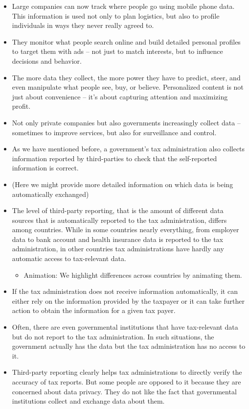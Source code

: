 \documentclass[11pt]{article}
\begin{document}
\begin{itemize}
    \item Large companies can now track where people go using mobile phone data. This information is used not only to plan logistics, but also to profile individuals in ways they never really agreed to.
    \item They monitor what people search online and build detailed personal profiles to target them with ads – not just to match interests, but to influence decisions and behavior.
    \item The more data they collect, the more power they have to predict, steer, and even manipulate what people see, buy, or believe. Personalized content is not just about convenience – it’s about capturing attention and maximizing profit.
    \item Not only private companies but also governments increasingly collect data – sometimes to improve services, but also for surveillance and control.
    \item As we have mentioned before, a government's tax administration also collects information reported by third-parties to check that the self-reported information is correct. 
    \item (Here we might provide more detailed information on which data is being automatically exchanged)
    \item The level of third-party reporting, that is the amount of different data sources that is automatically reported to the tax administration, differs among countries. While in some countries nearly everything, from employer data to bank account and health insurance data is reported to the tax administration, in other countries tax administrations have hardly any automatic access to tax-relevant data.
    \begin{itemize}
        \item Animation: We highlight differences across countries by animating them. 
    \end{itemize}
    \item If the tax administration does not receive information automatically, it can either rely on the information provided by the taxpayer or it can take further action to obtain the information for a given tax payer. 
    \item Often, there are even governmental institutions that have tax-relevant data but do not report to the tax administration. In such situations, the government actually has the data but the tax administration has no access to it.
    \item Third-party reporting clearly helps tax administrations to directly verify the accuracy of tax reports. But some people are opposed to it because they are concerned about data privacy. They do not like the fact that governmental institutions collect and exchange data about them.

\end{itemize}
\end{document}
